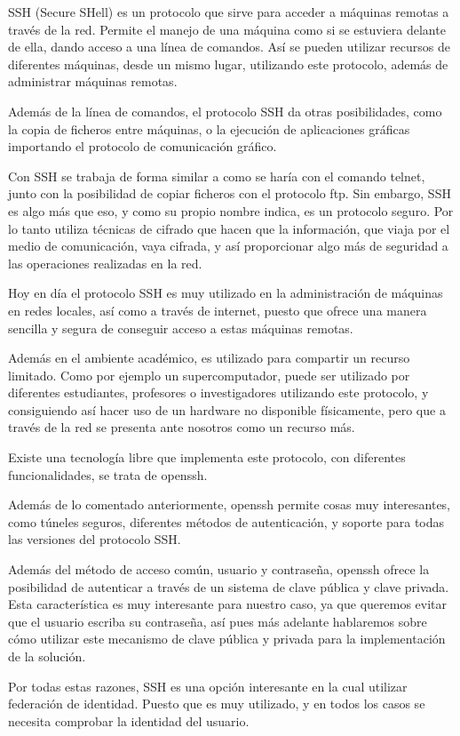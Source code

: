     SSH (Secure SHell) es un protocolo que sirve para acceder a máquinas
    remotas a través de la red. Permite el manejo de una máquina como si se
    estuviera delante de ella, dando acceso a una línea de comandos. Así se
    pueden utilizar recursos de diferentes máquinas, desde un mismo lugar,
    utilizando este protocolo, además de administrar máquinas remotas.

    Además de la línea de comandos, el protocolo SSH da otras
    posibilidades, como la copia de ficheros entre máquinas, o la ejecución
    de aplicaciones gráficas importando el protocolo de comunicación
    gráfico.

    Con SSH se trabaja de forma similar a como se haría con el comando
    telnet, junto con la posibilidad de copiar ficheros con el protocolo
    ftp. Sin embargo, SSH es algo más que eso, y como su propio nombre
    indica, es un protocolo seguro. Por lo tanto utiliza técnicas de
    cifrado que hacen que la información, que viaja por el medio de
    comunicación, vaya cifrada, y así proporcionar algo más de seguridad a
    las operaciones realizadas en la red.

    Hoy en día el protocolo SSH es muy utilizado en la administración de
    máquinas en redes locales, así como a través de internet, puesto que
    ofrece una manera sencilla y segura de conseguir acceso a estas
    máquinas remotas.

    Además en el ambiente académico, es utilizado para compartir un recurso
    limitado. Como por ejemplo un supercomputador, puede ser utilizado por
    diferentes estudiantes, profesores o investigadores utilizando este
    protocolo, y consiguiendo así hacer uso de un hardware no disponible
    físicamente, pero que a través de la red se presenta ante nosotros como
    un recurso más.

    Existe una tecnología libre que implementa este protocolo, con
    diferentes funcionalidades, se trata de openssh.

    Además de lo comentado anteriormente, openssh permite cosas muy
    interesantes, como túneles seguros, diferentes métodos de
    autenticación, y soporte para todas las versiones del protocolo SSH.

    Además del método de acceso común, usuario y contraseña, openssh ofrece
    la posibilidad de autenticar a través de un sistema de clave pública y
    clave privada. Esta característica es muy interesante para nuestro
    caso, ya que queremos evitar que el usuario escriba su contraseña, así
    pues más adelante hablaremos sobre cómo utilizar este mecanismo de
    clave pública y privada para la implementación de la solución.

    Por todas estas razones, SSH es una opción interesante en la cual
    utilizar federación de identidad. Puesto que es muy utilizado, y en
    todos los casos se necesita comprobar la identidad del usuario.



